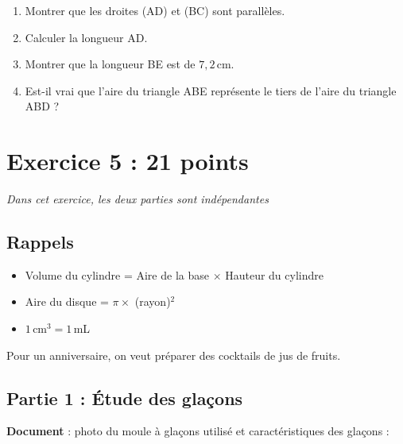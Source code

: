 \documentclass[11pt]{article}
\begin{document}
\medskip

\begin{enumerate}
\item Montrer que les droites (AD) et (BC) sont parallèles.
\item Calculer la longueur AD.
\item Montrer que la longueur BE est de $7,2$\,cm.
\item Est-il vrai que l'aire du triangle ABE représente le tiers de l'aire du triangle ABD ?
\end{enumerate}\hfill\parbox{.5\textwidth}{}

\section*{Exercice 5 : \hfill 21 points}

\emph{Dans cet exercice, les deux parties sont indépendantes}

\subsection*{Rappels}
\begin{itemize}[label=$\bullet~~$]
\item Volume du cylindre = Aire de la base $\times$ Hauteur du cylindre
\item Aire du disque = $\pi \times$ (rayon)$^2$
\item $1$\,cm$^3 = 1$\,mL
\end{itemize}

Pour un anniversaire, on veut préparer des cocktails de jus de fruits.

\subsection*{Partie 1 : Étude des glaçons}

\textbf{Document} : photo du moule à glaçons utilisé et caractéristiques des glaçons :

\medskip
\end{document}
